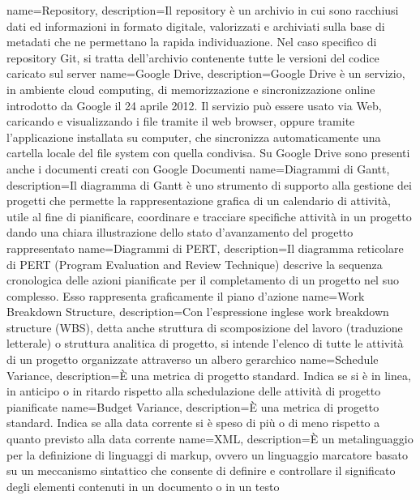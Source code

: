  {
	name=Repository,
	description={Il repository è un archivio in cui sono racchiusi dati ed informazioni in formato digitale, valorizzati e archiviati sulla base di metadati che ne permettano la rapida individuazione.
		Nel caso specifico di repository Git, si tratta dell'archivio contenente tutte le versioni del codice caricato sul server}
}
 {
	name=Google Drive,
	description={Google Drive è un servizio, in ambiente cloud computing, di memorizzazione e sincronizzazione online introdotto da Google il 24 aprile 2012. 
		Il servizio può essere usato via Web, caricando e visualizzando i file tramite il web browser, oppure tramite l'applicazione installata su computer, 
		che sincronizza automaticamente una cartella locale del file system con quella condivisa. Su Google Drive sono presenti anche i documenti creati con Google Documenti}
}
 {
	name=Diagrammi di Gantt,
	description={Il diagramma di Gantt è uno strumento di supporto alla gestione dei progetti che permette la rappresentazione grafica di un calendario di attività, 
		utile al fine di pianificare, coordinare e tracciare specifiche attività in un progetto dando una chiara illustrazione dello stato d'avanzamento del progetto rappresentato}
}
 {
	name=Diagrammi di PERT,
	description={Il diagramma reticolare di PERT (Program Evaluation and Review Technique) descrive la sequenza cronologica delle azioni pianificate per il completamento di un progetto nel suo complesso.
		Esso rappresenta graficamente il piano d'azione}
}
 {
	name=Work Breakdown Structure,
	description={Con l'espressione inglese work breakdown structure (WBS), detta anche struttura di scomposizione del lavoro (traduzione letterale) o struttura analitica di progetto, 
		si intende l'elenco di tutte le attività di un progetto organizzate attraverso un albero gerarchico}
}
 {
	name=Schedule Variance,
	description={È una metrica di progetto standard. Indica se si è in linea, in anticipo o in ritardo rispetto alla schedulazione delle attività di progetto pianificate}
}
 {
	name=Budget Variance,
	description={È una metrica di progetto standard. Indica se alla data corrente si è speso di più o di meno rispetto a quanto previsto alla data corrente}
}
 {
	name=XML,
	description={È un metalinguaggio per la definizione di linguaggi di markup, ovvero un linguaggio marcatore basato su un meccanismo sintattico che consente di definire e controllare il significato degli elementi contenuti in un documento o in un testo}
}
